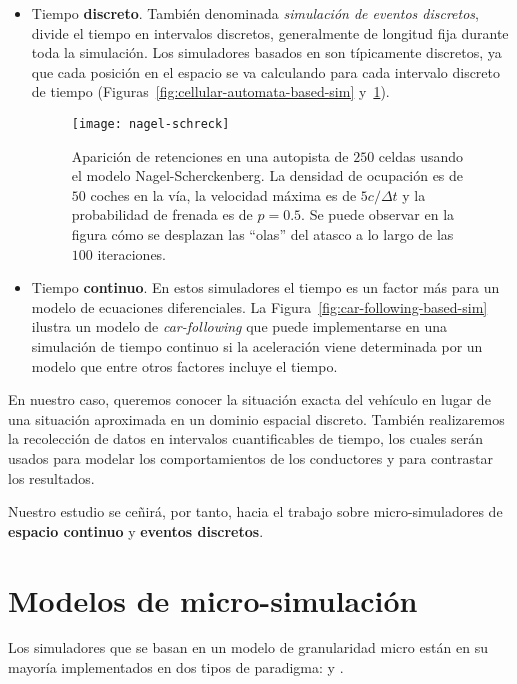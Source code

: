 \begin{itemize}
	\item Tiempo \textbf{discreto}. También denominada \textit{simulación de eventos discretos}, divide el tiempo en intervalos discretos, generalmente de longitud fija durante toda la simulación. Los simuladores basados en  son típicamente discretos, ya que cada posición en el espacio se va calculando para cada intervalo discreto de tiempo (Figuras~\ref{fig:cellular-automata-based-sim} y~\ref{fig:nagel-schreck}).
	
	\begin{figure}
		\centering
		\texttt{[image: nagel-schreck]}
		\caption[Ejemplo de efecto de ondas de choque en simulación de tipo Nagel-Scherckenberg]{Aparición de retenciones en una autopista de $250$ celdas usando el modelo Nagel-Scherckenberg. La densidad de ocupación es de $50$ coches en la vía, la velocidad máxima es de $5 c/\Delta t$ y la probabilidad de frenada es de $p = 0.5$. Se puede observar en la figura cómo se desplazan las \enquote{olas} del atasco a lo largo de las $100$ iteraciones.}
		\label{fig:nagel-schreck}
	\end{figure}
	
	\item Tiempo \textbf{continuo}. En estos simuladores el tiempo es un factor más para un modelo de ecuaciones diferenciales. La Figura~\ref{fig:car-following-based-sim} ilustra un modelo de \textit{\gls{car-following}} que puede implementarse en una simulación de tiempo continuo si la aceleración viene determinada por un modelo que entre otros factores incluye el tiempo.
\end{itemize}

En nuestro caso, queremos conocer la situación exacta del vehículo en lugar de una situación aproximada en un dominio espacial discreto. También realizaremos la recolección de datos en intervalos cuantificables de tiempo, los cuales serán usados para modelar los comportamientos de los conductores y para contrastar los resultados.

Nuestro estudio se ceñirá, por tanto, hacia el trabajo sobre micro-simuladores de \textbf{espacio continuo} y \textbf{eventos discretos}.

\section{Modelos de micro-simulación}

Los simuladores que se basan en un modelo de granularidad micro están en su mayoría implementados en dos tipos de paradigma:  y .

